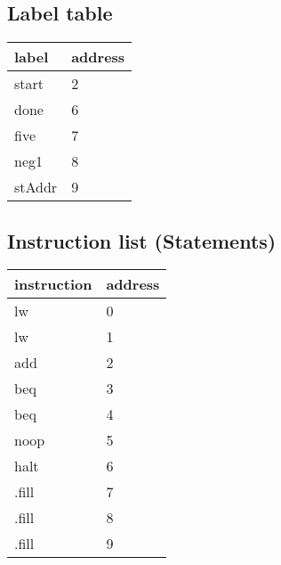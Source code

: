 \documentclass[14pt]{article}
\begin{document}
\subsection{Label table}
\begin{center}
    \begin{tabular}{|C{2cm}|C{3cm}|}
        \hline
        label & address\\
        \hline
        start & 2\\
        \hline
        done & 6\\
        \hline
        five & 7\\
        \hline
        neg1 & 8\\
        \hline
        stAddr & 9\\
        \hline
\end{tabular}
\end{center}
\subsection{Instruction list (Statements)}
\begin{center}
    \begin{tabular}{|C{2cm}|C{3cm}|}
        \hline
        instruction & address\\
        \hline
        lw & 0\\
        \hline
        lw & 1\\
        \hline
        add & 2\\
        \hline
        beq & 3\\
        \hline
        beq & 4\\
        \hline
        noop & 5\\
        \hline
        halt & 6\\
        \hline
        .fill & 7\\
        \hline
        .fill & 8\\
        \hline
        .fill & 9\\
        \hline
\end{tabular}
\end{center}
   


\newpage
\end{document}
